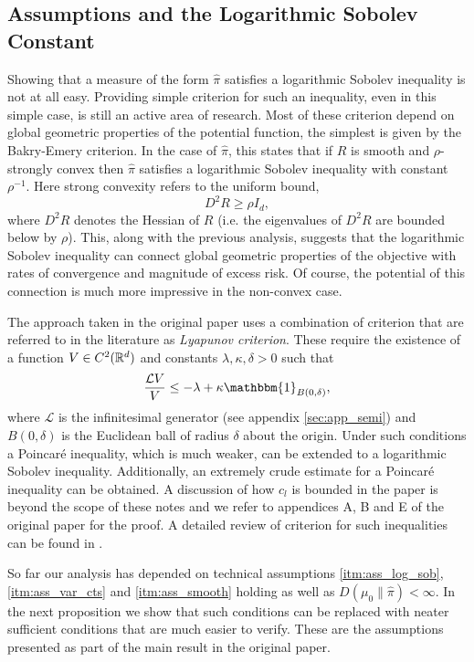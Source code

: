 \documentclass{article}
\newcommand{\Bcal}[1]{\mathcal{#1}}
\begin{document}
\subsection{Assumptions and the Logarithmic Sobolev Constant}
Showing that a measure of the form \(\hat{\pi}\) satisfies a logarithmic Sobolev inequality is not at all easy. Providing simple criterion for such an inequality, even in this simple case, is still an active area of research. Most of these criterion depend on global geometric properties of the potential function, the simplest is given by the Bakry-Emery criterion. In the case of \(\hat{\pi}\), this states that if \(R\) is smooth and \(\rho\)-strongly convex then \(\hat{\pi}\) satisfies a logarithmic Sobolev inequality with constant \(\rho^{-1}\). Here strong convexity refers to the uniform bound,
\begin{equation*}
    D^2 R \geq \rho I_d,
\end{equation*}
where \(D^2R\) denotes the Hessian of \(R\) (i.e. the eigenvalues of \(D^2 R\) are bounded below by \(\rho\)). This, along with the previous analysis, suggests that the logarithmic Sobolev inequality can connect global geometric properties of the objective with rates of convergence and magnitude of excess risk. Of course, the potential of this connection is much more impressive in the non-convex case.

The approach taken in the original paper uses a combination of criterion that are referred to in the literature as \textit{Lyapunov criterion}. These require the existence of a function \(V \in C^2(\Bbb{R}^d)\) and constants \(\lambda, \kappa, \delta > 0\) such that
\begin{equation*}
    \frac{\Bcal{L}V}{V} \leq -\lambda + \kappa \mathbbm{1}_{B(0, \delta)},
\end{equation*}
where \(\Bcal{L}\) is the infinitesimal generator (see appendix \ref{sec:app_semi}) and \(B(0, \delta)\) is the Euclidean ball of radius \(\delta\) about the origin. Under such conditions a Poincar\'{e} inequality, which is much weaker, can be extended to a logarithmic Sobolev inequality. Additionally, an extremely crude estimate for a Poincar\'{e} inequality can be obtained. A discussion of how \(c_l\) is bounded in the paper is beyond the scope of these notes and we refer to appendices A, B and E of the original paper for the proof. A detailed review of criterion for such inequalities can be found in \cite{Bakry2014AnalysisOperators}.

So far our analysis has depended on technical assumptions \ref{itm:ass_log_sob}, \ref{itm:ass_var_cts} and \ref{itm:ass_smooth} holding as well as \(D(\mu_0 \| \hat{\pi}) < \infty\). In the next proposition we show that such conditions can be replaced with neater sufficient conditions that are much easier to verify. These are the assumptions presented as part of the main result in the original paper.
\end{document}
